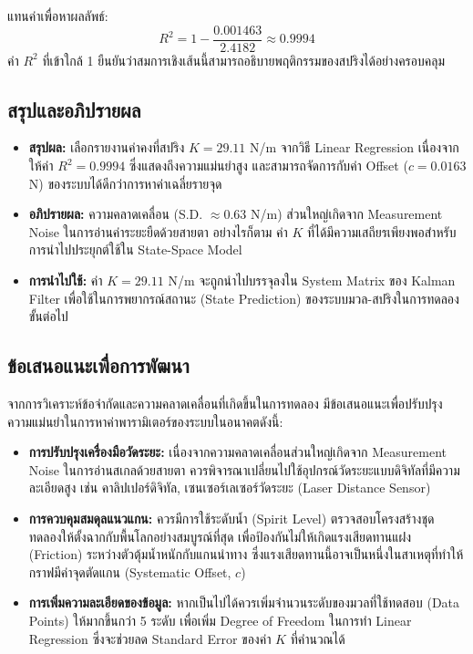 แทนค่าเพื่อหาผลลัพธ์:
\begin{equation}
    R^2 = 1 - \frac{0.001463}{2.4182} \approx 0.9994
\end{equation}
ค่า $R^2$ ที่เข้าใกล้ 1 ยืนยันว่าสมการเชิงเส้นนี้สามารถอธิบายพฤติกรรมของสปริงได้อย่างครอบคลุม

\subsection{สรุปและอภิปรายผล}

\begin{itemize}
    \item \textbf{สรุปผล:} เลือกรายงานค่าคงที่สปริง $K = 29.11$ N/m จากวิธี Linear Regression เนื่องจากให้ค่า $R^2 = 0.9994$ ซึ่งแสดงถึงความแม่นยำสูง และสามารถจัดการกับค่า Offset ($c = 0.0163$ N) ของระบบได้ดีกว่าการหาค่าเฉลี่ยรายจุด
    \item \textbf{อภิปรายผล:} ความคลาดเคลื่อน (S.D. $\approx 0.63$ N/m) ส่วนใหญ่เกิดจาก Measurement Noise ในการอ่านค่าระยะยืดด้วยสายตา อย่างไรก็ตาม ค่า $K$ ที่ได้มีความเสถียรเพียงพอสำหรับการนำไปประยุกต์ใช้ใน State-Space Model
    \item \textbf{การนำไปใช้:} ค่า $K = 29.11$ N/m จะถูกนำไปบรรจุลงใน System Matrix ของ Kalman Filter เพื่อใช้ในการพยากรณ์สถานะ (State Prediction) ของระบบมวล-สปริงในการทดลองขั้นต่อไป
\end{itemize}

\subsection{ข้อเสนอแนะเพื่อการพัฒนา}

จากการวิเคราะห์ข้อจำกัดและความคลาดเคลื่อนที่เกิดขึ้นในการทดลอง มีข้อเสนอแนะเพื่อปรับปรุงความแม่นยำในการหาค่าพารามิเตอร์ของระบบในอนาคตดังนี้:

\begin{itemize}
    \item \textbf{การปรับปรุงเครื่องมือวัดระยะ:} เนื่องจากความคลาดเคลื่อนส่วนใหญ่เกิดจาก Measurement Noise ในการอ่านสเกลด้วยสายตา ควรพิจารณาเปลี่ยนไปใช้อุปกรณ์วัดระยะแบบดิจิทัลที่มีความละเอียดสูง เช่น คาลิปเปอร์ดิจิทัล, เซนเซอร์เลเซอร์วัดระยะ (Laser Distance Sensor) 
    \item \textbf{การควบคุมสมดุลแนวแกน:} ควรมีการใช้ระดับน้ำ (Spirit Level) ตรวจสอบโครงสร้างชุดทดลองให้ตั้งฉากกับพื้นโลกอย่างสมบูรณ์ที่สุด เพื่อป้องกันไม่ให้เกิดแรงเสียดทานแฝง (Friction) ระหว่างตัวตุ้มน้ำหนักกับแกนนำทาง ซึ่งแรงเสียดทานนี้อาจเป็นหนึ่งในสาเหตุที่ทำให้กราฟมีค่าจุดตัดแกน (Systematic Offset, $c$) 
    \item \textbf{การเพิ่มความละเอียดของข้อมูล:} หากเป็นไปได้ควรเพิ่มจำนวนระดับของมวลที่ใช้ทดสอบ (Data Points) ให้มากขึ้นกว่า 5 ระดับ เพื่อเพิ่ม Degree of Freedom ในการทำ Linear Regression ซึ่งจะช่วยลด Standard Error ของค่า $K$ ที่คำนวณได้
\end{itemize}